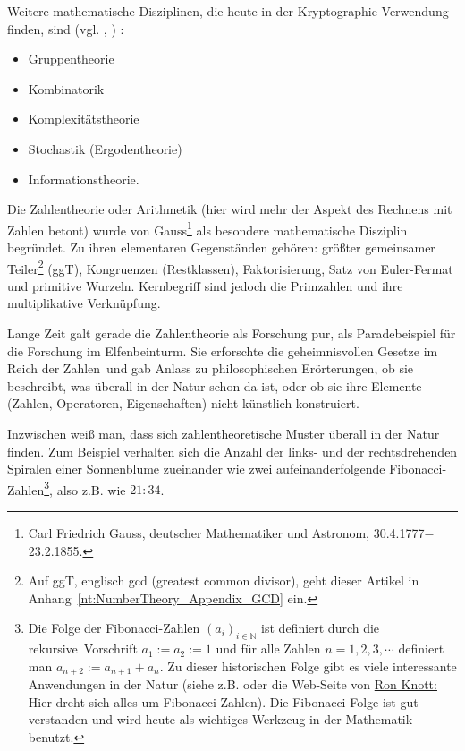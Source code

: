 \begin{refsegment}
Weitere mathematische Disziplinen, die heute in der Kryptographie
Verwendung finden, sind
(vgl. \cite[S. 2]{Bauer1995}, \cite[Seite 3]{Bauer2000}) :
\begin{itemize}
    \item Gruppentheorie
    \item Kombinatorik
    \item Komplexitätstheorie
    \item Stochastik (Ergodentheorie)
    \item Informationstheorie.
\end{itemize}

Die Zahlentheorie oder Arithmetik (hier wird mehr der Aspekt des Rechnens
mit Zahlen betont) wurde von Gauss\footnote{%
  Carl Friedrich Gauss, deutscher Mathematiker und Astronom,
  30.4.1777$-$23.2.1855.
}
als besondere mathematische Disziplin begründet. Zu ihren elementaren
Gegenständen gehören: größter gemeinsamer Teiler\footnote{%
Auf ggT, englisch gcd (greatest common divisor), geht dieser
Artikel in Anhang~\ref{nt:NumberTheory_Appendix_GCD} ein.
} (ggT), Kongruenzen (Restklassen), Faktorisierung, Satz von Euler-Fermat und
primitive Wurzeln. Kernbegriff sind jedoch die Primzahlen und ihre
multiplikative Verknüpfung.

Lange Zeit galt gerade die Zahlentheorie als Forschung pur, als
Paradebeispiel für die Forschung im Elfenbeinturm. Sie erforschte die
\glqq geheimnisvollen Gesetze im Reich der Zahlen\grqq~und gab Anlass zu
philosophischen Erörterungen, ob sie beschreibt, was überall in der Natur
schon da ist, oder ob sie ihre Elemente (Zahlen, Operatoren, Eigenschaften)
nicht künstlich konstruiert.

Inzwischen weiß man, dass sich zahlentheoretische Muster überall in der Natur
finden. Zum Beispiel verhalten sich die Anzahl der links- und der
rechtsdrehenden Spiralen einer Sonnenblume zueinander wie zwei
aufeinanderfolgende Fibonacci-Zahlen\footnote{%
Die Folge der Fibonacci-Zahlen $(a_i)_{i \in \mathbb{N}}$ ist definiert durch
die \glqq rekursive\grqq~Vorschrift $a_1 := a_2 := 1$ und für alle Zahlen  $n=1,2,3,\cdots$ definiert man
$a_{n+2} := a_{n+1}+a_n$.  Zu dieser historischen Folge gibt es viele interessante
Anwendungen in der Natur (siehe z.B. \cite[S. 290 ff]{Graham1994}
oder die Web-Seite von \hyperlink{knott}{Ron Knott:}
Hier dreht sich alles um Fibonacci-Zahlen).
Die Fibonacci-Folge ist gut verstanden und wird heute als
wichtiges Werkzeug in der Mathematik benutzt.
}, also z.B.  wie  $21 : 34$.


\end{refsegment}
